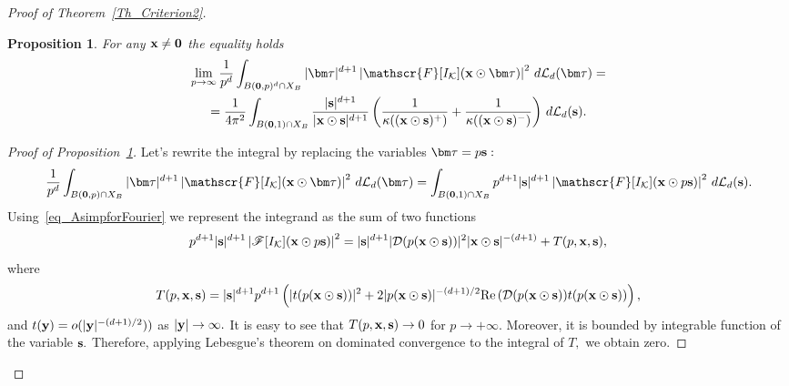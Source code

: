 \documentclass[12pt]{article}
\newtheorem{proposition}{Proposition}
\begin{document}
\begin{proof}[Proof of Theorem~\ref{Th_Criterion2}]
\begin{proposition}\label{Pr_limit}
For any ${\bf x}\neq{\bf 0}$ the equality holds
\begin{multline*}
\lim_{p\to\infty}\frac{1}{p^d}\int_{B({\bf0},p)^d\cap X_B}|{\bm\tau}|^{d+1}\left|\mathscr{F}[I_{\mathcal{K}}]({\bf x}\odot{\bm\tau})\right|^2\,d\mathcal{L}_d({\bm\tau})=\\
=\frac{1}{4\pi^2}\int_{B({\bf0},1)\cap X_B}\frac{|{\bf s}|^{d+1}}{|{\bf x}\odot{\bf s}|^{d+1}}
\left(\frac{1}{\kappa(({\bf x}\odot{\bf s})^+)}+\frac{1}{\kappa(({\bf x}\odot{\bf s})^-)}\right)\,d\mathcal{L}_d({\bf s}).
\end{multline*}	
\end{proposition}
\begin{proof}[Proof of Proposition~\ref{Pr_limit}]
Let's rewrite the integral by replacing the variables ${{\bm\tau}=p{\bf s}}:$
$$
\frac{1}{p^d}\int_{B({\bf0},p)\cap X_B}|{\bm\tau}|^{d+1}\left|\mathscr{F}[I_{\mathcal{K}}]({\bf x}\odot{\bm\tau})\right|^2\,d\mathcal{L}_d({\bm\tau})=\int_{B({\bf0},1)\cap X_B}p^{d+1}
|{\bf s}|^{d+1}\left|\mathscr{F}[I_{\mathcal{K}}]({\bf x}\odot p{\bf s})\right|^2\,d\mathcal{L}_d({\bf s}).
$$
Using~\eqref{eq_AsimpforFourier} we represent the integrand as the sum of two functions
\begin{equation}\label{eq_Asymp1}
p^{d+1}|{\bf s}|^{d+1}\left|\mathscr{F}[I_{\mathcal{K}}]({\bf x}\odot p{\bf s})\right|^2=
|{\bf s}|^{d+1}|\mathcal{D}(p({\bf x}\odot{\bf s}))|^2|{\bf x}\odot {\bf s}|^{-(d+1)}+T(p,{\bf x},{\bf s}),
\end{equation}
where
\begin{equation}\label{eq_Asymp2}
T(p,{\bf x}, {\bf s})=|{\bf s}|^{d+1}p^{d+1}\left(|t(p({\bf x}\odot{\bf s}))|^2+2|p({\bf x}\odot{\bf s})|^{-(d+1)/2}\mathrm{Re}\,(\mathcal{D}(p({\bf x}\odot{\bf s}))t(p({\bf x}\odot{\bf s}))\right),
\end{equation}
and ${t({\bf y})=o(|{\bf y}|^{-(d+1)/2}))}$ as ${|{\bf y}|\to\infty}.$
It is easy to see that ${{T(p,{\bf x}, {\bf s})}\to0}$ for ${p\to+\infty}.$ Moreover, it is  bounded by integrable function of the variable ${\bf s}.$ Therefore, applying Lebesgue's theorem on dominated convergence to the integral of $T,$ we obtain zero.


\end{proof}
\end{proof}
\end{document}
